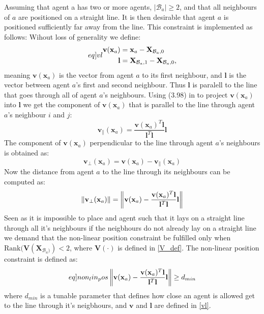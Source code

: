 Assuming that agent a has two or more agents, $|\mathcal{B}_{a}|\geq 2$, and that all neighbours of $a$ are positioned on a straight line. It is then desirable that agent $a$ is positioned sufficiently far away from the line. This constraint is implemented as follows:
Wihout loss of generality we define:
\begin{subequations}\label[eq]{vl}
  \begin{align}
    \mathbf{v}(\mathbf{x}_{a}) &= \mathbf{x}_{a} - \mathbf{X}_{\mathcal{B}_{a}, 0}\\
    \mathbf{l} &= \mathbf{X}_{\mathcal{B}_{a}, 1} - \mathbf{X}_{\mathcal{B}_{a}, 0},
  \end{align}
\end{subequations}
meaning $\mathbf{v}(\mathbf{x}_{a})$ is the vector from agent $a$ to its first neighbour, and $\mathbf{l}$ is the vector between agent $a$'s first and second neighbour. Thus $\mathbf{l}$ is paralell to the line 
that goes through all of agent $a$'s neighbours.
Using (3.98) in \cite{projection} to project $\mathbf{v}(\mathbf{x}_{a})$ into $\mathbf{l}$ we get the component of $\mathbf{v}(\mathbf{x}_{a})$ that is parallel to the line
through agent $a$'s neighbour $i$ and $j$:
\begin{equation}
  \mathbf{v}_{\parallel}(\mathbf{x}_{a}) = \frac{\mathbf{v}(\mathbf{x}_{a})^{T}\mathbf{l}}{\mathbf{l}^{T}\mathbf{l}}\mathbf{l}
\end{equation}
The component of $\mathbf{v}(\mathbf{x}_{a})$ perpendicular to the line through agent $a$'s
neighbours is obtained as:
\begin{equation}
  \mathbf{v}_{\perp}(\mathbf{x}_{a}) = \mathbf{v}(\mathbf{x}_{a}) - \mathbf{v}_{\parallel}(\mathbf{x}_{a})
\end{equation}
Now the distance from agent $a$ to the line through its neighbours can be computed as:
\begin{equation}
  \left\lVert\mathbf{v}_{\perp}(\mathbf{x}_{a})\right\rVert = \left\lVert\mathbf{v}(\mathbf{x}_{a}) - \frac{\mathbf{v}(\mathbf{x}_{a})^{T}\mathbf{l}}{\mathbf{l}^{T}\mathbf{l}}\mathbf{l}\right\rVert
\end{equation}
Seen as it is impossible to place and agent such that it lays on a straight line through all it's neighbours if the neigbhours do not already
lay on a straight line we demand that the non-linear position constraint be fulfilled only when $\mathrm{Rank}(\mathbf{V}(\mathbf{X}_{\mathcal{B}_{a})}) < 2$, where $\mathbf{V}(\cdot)$ is defined in \eqref{V_def}. The non-linear position constraint is defined as:
\begin{equation}\label[eq]{non_lin_pos}
    \norm{\mathbf{v}(\mathbf{x}_{a}) - \frac{\mathbf{v}(\mathbf{x}_{a})^{T}\mathbf{l}}{\mathbf{l}^{T}\mathbf{l}}\mathbf{l}}\geq d_{min} 
\end{equation}
where $d_{min}$ is a tunable parameter that defines how close an agent is allowed get to the line through it's neigbhours, and $\mathbf{v}$ and $\mathbf{l}$
are defined in \eqref{vl}.

